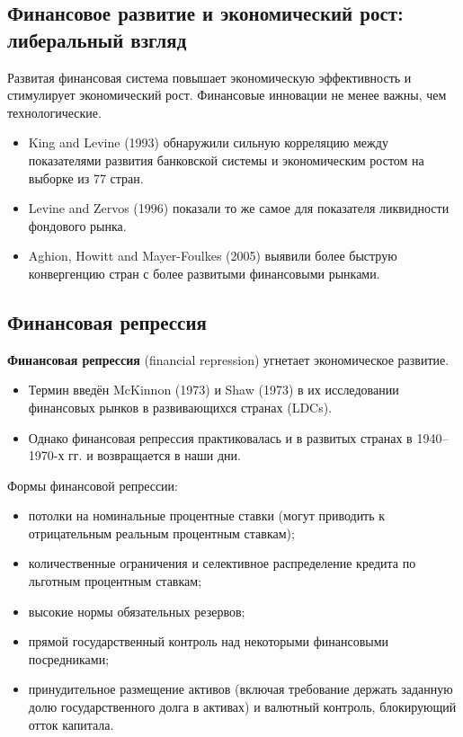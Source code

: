 \documentclass[10pt,a4paper]{article}
\begin{document}
\subsection{Финансовое развитие и экономический рост: либеральный взгляд}

Развитая финансовая система повышает экономическую эффективность и стимулирует экономический рост. Финансовые инновации не менее важны, чем технологические.
\begin{itemize}[leftmargin=1.3em]
\item King and Levine (1993) обнаружили сильную корреляцию между показателями развития банковской системы и экономическим ростом на выборке из 77 стран.
\item Levine and Zervos (1996) показали то же самое для показателя ликвидности фондового рынка.
\item Aghion, Howitt and Mayer-Foulkes (2005) выявили более быструю конвергенцию стран с более развитыми финансовыми рынками.
\end{itemize}

\subsection{Финансовая репрессия}

\textbf{Финансовая репрессия} (financial repression) угнетает экономическое развитие.
\begin{itemize}[leftmargin=1.3em]
\item Термин введён McKinnon (1973) и Shaw (1973) в их исследовании финансовых рынков в развивающихся странах (LDCs).
\item Однако финансовая репрессия практиковалась и в развитых странах в 1940--1970-х гг. и возвращается в наши дни.
\end{itemize}

Формы финансовой репрессии:
\begin{itemize}[leftmargin=1.3em]
\item потолки на номинальные процентные ставки (могут приводить к отрицательным реальным процентным ставкам);
\item количественные ограничения и селективное распределение кредита по льготным процентным ставкам;
\item высокие нормы обязательных резервов;
\item прямой государственный контроль над некоторыми финансовыми посредниками;
\item принудительное размещение активов (включая требование держать заданную долю государственного долга в активах) и валютный контроль, блокирующий отток капитала.
\end{itemize}
\end{document}
